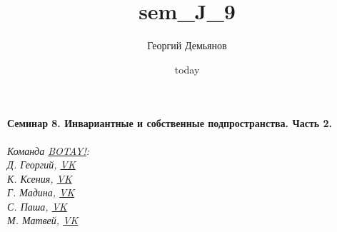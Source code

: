 \documentclass[a4paper,12pt]{article}
\title{sem_J_9}
\author{Георгий Демьянов}
\date{today}
\begin{document}
\paragraph{{\LARGE Семинар 8. Инвариантные и собственные подпространства. Часть 2.}\\}















\begin{center}
	\vfill \emph{{\small Команда \href{https://vk.com/botay_fizteh}{BOTAY!}:\\
			Д. Георгий, \href{https://vk.com/id37346992}{VK}\\
			К. Ксения, \href{https://vk.com/id143862366}{VK}\\
			Г. Мадина, \href{https://vk.com/id226312463}{VK}\\
			С. Паша, \href{https://vk.com/id181006282}{VK}\\
			М. Матвей, \href{https://vk.com/id62009425}{VK}\\
	}}
\end{center}
\end{document}
